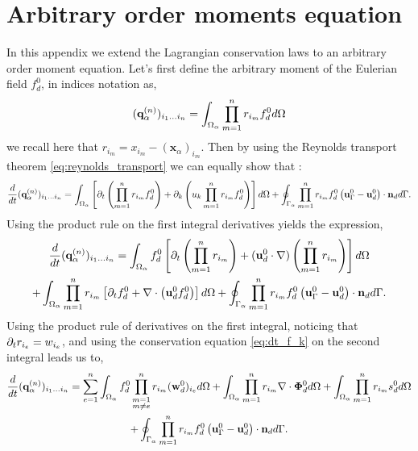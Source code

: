 
\section{Arbitrary order moments equation}
\label{ap:Moments_equations}
In this appendix we extend the Lagrangian conservation laws to an arbitrary order moment equation. 
Let's first define the arbitrary moment of the Eulerian field $f_d^0$, in indices notation as, 
\begin{equation*}
    (\textbf{q}_\alpha^{(n)})_{i_1\ldots i_n}
    = \int_{\Omega_{\alpha}} 
    \prod_{m=1}^{n} r_{i_m} f_d^0 
     d\Omega
\end{equation*}
we recall here that $r_{i_m} = x_{i_m} - (\textbf{x}_\alpha)_{i_m}$. 
Then by using the Reynolds transport theorem \ref{eq:reynolds_transport} we can equally show that :
\begin{equation}
    \frac{d}{dt} {(\textbf{q}_\alpha^{(n)})_{i_1\ldots i_n}}
    =\int_{\Omega_{\alpha}} 
        \left[ \partial_t \left(\prod_{m=1}^{n} r_{i_m}f_d^0\right) 
    + \partial_k \left(u_k \prod_{m=1}^{n} r_{i_m}f_d^0\right) \right]
     d\Omega
    +\oint_{\Gamma_{\alpha}}  \prod_{m=1}^{n} r_{i_m} f_d^0 \left(\textbf{u}_\Gamma^0 - \textbf{u}_d^0\right)\cdot \textbf{n}_d  d\Gamma. 
\end{equation}
Using the product rule on the first integral derivatives yields the expression, 
\begin{multline*}
    \frac{d}{dt} {(\textbf{q}_\alpha^{(n)})_{i_1\ldots i_n}}
    =\int_{\Omega_{\alpha}}  
        f_d^0 \left[ \partial_t \left(\prod_{m=1}^{n} r_{i_m}\right) 
        + (\textbf{u}_d^0\cdot \mathbf{\nabla}) \left( \prod_{m=1}^{n} r_{i_m}\right) \right]
     d\Omega\\
    +\int_{\Omega_{\alpha}}  
        \prod_{m=1}^{n} r_{i_m} 
        \left[ \partial_t f_d^0
    +  \mathbf{\nabla}\cdot \left(\textbf{u}_d^0 f_d^0 \right) \right]
     d\Omega
    +\oint_{\Gamma_{\alpha}}  \prod_{m=1}^{n} r_{i_m} f_d^0 \left(\textbf{u}_\Gamma^0 - \textbf{u}_d^0\right)\cdot \textbf{n}_d  d\Gamma. 
\end{multline*}
Using the product rule of derivatives on the first integral, noticing that $\partial_t r_{i_e} = w_{i_e}$, and using the conservation equation \ref{eq:dt_f_k} on the second integral leads us to, 
\begin{multline*}
    \frac{d}{dt} {(\textbf{q}_\alpha^{(n)})_{i_1\ldots i_n}}
    = \sum_{e=1}^{n} \int_{\Omega_{\alpha}}  
        f_d^0 \prod^{n}_{\substack{ m=1 \\   m \neq e}} r_{i_m} (\textbf{w}_d^0)_{i_e}
         d\Omega
    +\int_{\Omega_{\alpha}} \prod_{m=1}^{n} r_{i_m} \mathbf{\nabla}\cdot\bm{\Phi}_d^0 d\Omega
    + \int_{\Omega_{\alpha}}  \prod_{m=1}^{n} r_{i_m} s_d^0 d\Omega\\
    +\oint_{\Gamma_{\alpha}}  \prod_{m=1}^{n} r_{i_m} f_d^0 \left(\textbf{u}_\Gamma^0 - \textbf{u}_d^0\right)\cdot \textbf{n}_d  d\Gamma.
\end{multline*}
